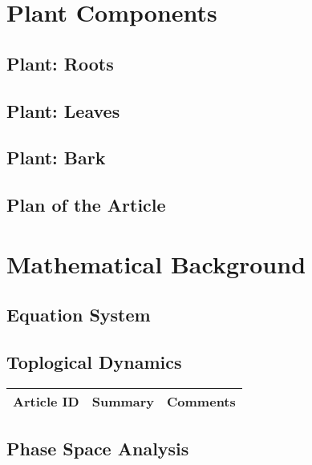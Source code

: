 \section{Plant Components}

\subsection{Plant: Roots}

\subsection{Plant: Leaves}

\subsection{Plant: Bark}


\subsection{Plan of the Article}

\begin{enumerate}
\end{enumerate}



\section{Mathematical Background}


\subsection{Equation System}




\subsection{Toplogical Dynamics}

\begin{table}[H]\centering
	\begin{tabular}{p{1cm}p{4cm}p{3cm}}
		Article ID & Summary & Comments\\
		\hline
		\hline
	\end{tabular}
\end{table}

\subsection{Phase Space Analysis}

